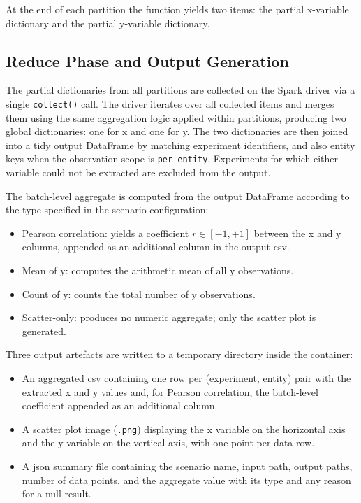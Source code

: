 At the end of each partition the function yields two items: the partial x-variable dictionary and
the partial y-variable dictionary.

\subsection{Reduce Phase and Output Generation}
\label{subsec:cap4-reduce-phase-and-output-generation}

The partial dictionaries from all partitions are collected on the Spark driver via a single
\texttt{collect()} call. The driver iterates over all collected items and merges them using the
same aggregation logic applied within partitions, producing two global dictionaries: one for x
and one for y. The two dictionaries are then joined into a tidy output DataFrame by matching
experiment identifiers, and also entity keys when the observation scope is \texttt{per\_entity}.
Experiments for which either variable could not be extracted are excluded from the output.

The batch-level aggregate is computed from the output DataFrame according to the type specified in
the scenario configuration:

\begin{itemize}
    \item Pearson correlation: yields a coefficient $r \in [-1, +1]$ between the x and y
          columns, appended as an additional column in the output \gls{csv}.
    \item Mean of y: computes the arithmetic mean of all y observations.
    \item Count of y: counts the total number of y observations.
    \item Scatter-only: produces no numeric aggregate; only the scatter plot is generated.
\end{itemize}

Three output artefacts are written to a temporary directory inside the container:

\begin{itemize}
    \item An aggregated \gls{csv} containing one row per (experiment, entity) pair with the
          extracted x and y values and, for Pearson correlation, the batch-level coefficient
          appended as an additional column.
    \item A scatter plot image (\texttt{.png}) displaying the x variable on the horizontal axis
          and the y variable on the vertical axis, with one point per data row.
    \item A \gls{json} summary file containing the scenario name, input path, output paths,
          number of data points, and the aggregate value with its type and any reason for a null
          result.
\end{itemize}


